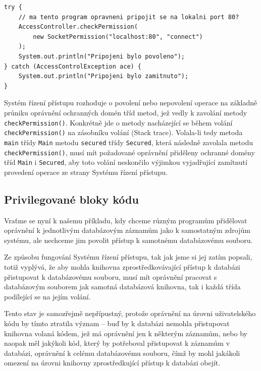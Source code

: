 \begin{lstlisting}[caption=Příklad použití Systému řízení přístupu, label=pouzitiAC]
try {
    // ma tento program opravneni pripojit se na lokalni port 80?
    AccessController.checkPermission(
        new SocketPermission("localhost:80", "connect")
    );
    System.out.println("Pripojeni bylo povoleno");
} catch (AccessControlException ace) {
    System.out.println("Pripojeni bylo zamitnuto");
}
\end{lstlisting}

Systém řízení přístupu rozhoduje o povolení nebo nepovolení operace na základně průniku oprávnění ochranných domén tříd metod, jež vedly k zavolání metody {\tt checkPermission()}. Konkrétně jde o metody nacházející se během volání {\tt checkPermission()} na zásobníku volání (Stack trace). Volala-li tedy metoda {\tt main} třídy {\tt Main} metodu {\tt secured} třídy {\tt Secured}, která následně zavolala metodu {\tt checkPermission()}, musí mít požadované oprávnění přiděleny ochranné domény tříd {\tt Main} i {\tt Secured}, aby toto volání neskončilo výjimkou vyjadřující zamítnutí provedení operace ze strany Systému řízení přístupu. \cite[5.5]{oaks}\cite[6.1]{oaks}

\subsection{Privilegované bloky kódu}\label{privilegovaneBloky}

Vraťme se nyní k našemu příkladu, kdy chceme různým programům přidělovat oprávnění k jednotlivým databázovým záznamům jako k samostatným zdrojům systému, ale nechceme jim povolit přístup k samotnému databázovému souboru.

Ze způsobu fungování Systému řízení přístupu, tak jak jsme si jej zatím popsali, totiž vyplývá, že aby mohla knihovna zprostředkovávající přístup k databázi přistupovat k databázovému souboru, musí mít oprávnění pracovat s databázovým souborem jak samotná databázová knihovna, tak i každá třída podílející se na jejím volání.

Tento stav je samozřejmě nepřípustný, protože oprávnění na úrovni uživatelského kódu by tímto ztratila význam -- buď by k databázi nemohla přistupovat knihovna volaná kódem, jež má oprávnění jen k některým záznamům, nebo by naopak měl jakýkoli kód, který by potřeboval přistupovat k záznamům v databázi, oprávnění k celému databázovému souboru, čímž by mohl jakákoli omezení na úrovni knihovny zprostředkující přístup k databázi obejít.

